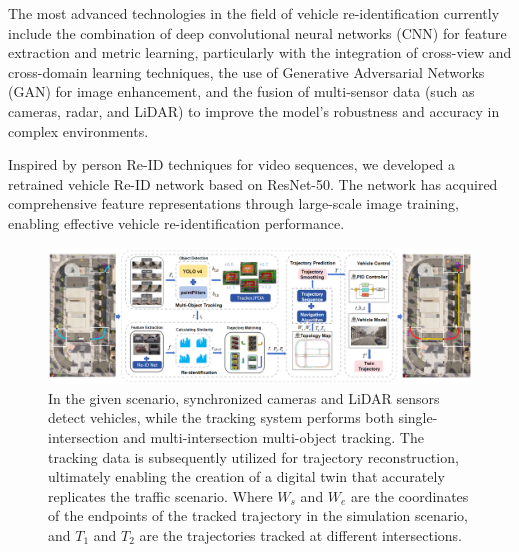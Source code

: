 \documentclass[lettersize,journal]{IEEEtran}
\begin{document}
The most advanced technologies in the field of vehicle re-identification currently include the combination of deep convolutional neural networks (CNN) for feature extraction and metric learning\cite{Alpher20g}, particularly with the integration of cross-view and cross-domain learning techniques, the use of Generative Adversarial Networks (GAN) for image enhancement\cite{Alpher21d}, and the fusion of multi-sensor data (such as cameras, radar, and LiDAR) to improve the model's robustness and accuracy in complex environments\cite{Alpher22g}.

Inspired by person Re-ID techniques for video sequences, we developed a retrained vehicle Re-ID network based on ResNet-50. 
The network has acquired comprehensive feature representations through large-scale image training, enabling effective vehicle re-identification performance.

\begin{figure}[t]
	\centering
	\includegraphics[width=\textwidth]{picture/picture2.png} 
	\caption{In the given scenario, synchronized cameras and LiDAR sensors detect vehicles, while the tracking system performs both single-intersection and multi-intersection multi-object tracking. The tracking data is subsequently utilized for trajectory reconstruction, ultimately enabling the creation of a digital twin that accurately replicates the traffic scenario. Where \(W_{s}\) and \(W_{e}\) are the coordinates of the endpoints of the tracked trajectory in the simulation scenario, and \(T_{1}\) and \(T_{2}\) are the trajectories tracked at different intersections.}
	\label{fig:2}
\end{figure}
\end{document}
